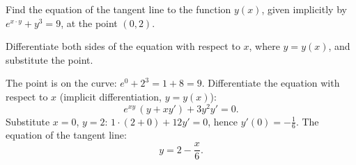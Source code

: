 
\begin{question}
Find the equation of the tangent line to the function $y(x)$, given implicitly by $e^{x\cdot y}+y^3=9$, at the point $(0,2)$.
\end{question}

\begin{hint}
Differentiate both sides of the equation with respect to $x$, where $y=y(x)$, and substitute the point.
\end{hint}

\begin{solution}
The point is on the curve: $e^{0}+2^3=1+8=9$. Differentiate the equation with respect to $x$ (implicit differentiation, $y=y(x)$):
\[ e^{xy}\,(y+xy')+3y^2y'=0 . \]
Substitute $x=0$, $y=2$: $1\cdot(2+0)+12y'=0$, hence $y'(0)=-\frac16$. The equation of the tangent line:
\[ \boxed{y=2-\frac{x}{6}} . \]
\end{solution}
